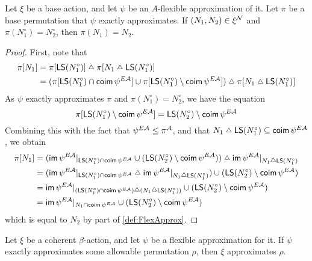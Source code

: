 \begin{proposition}
  \label{prop:FlexApprox.smul_nearLitter_eq}
  \leanok
  Let \( \xi \) be a base action, and let \( \psi \) be an \( A \)-flexible approximation of it.
  Let \( \pi \) be a base permutation that \( \psi \) exactly approximates.
  If \( (N_1, N_2) \in \xi^{\mathcal N} \) and \( \pi(N_1^\circ) = N_2^\circ \), then \( \pi(N_1) = N_2 \).
\end{proposition}
\begin{proof}
  \leanok
  First, note that
  \begin{align*}
    \pi[N_1] &= \pi[\LS(N_1^\circ)] \symmdiff \pi[N_1 \symmdiff \LS(N_1^\circ)] \\
    &= (\pi[\LS(N_1^\circ) \cap \coim \psi^{E\Atom}] \cup \pi[\LS(N_1^\circ) \setminus \coim \psi^{E\Atom}]) \symmdiff \pi[N_1 \symmdiff \LS(N_1^\circ)]
  \end{align*}
  As \( \psi \) exactly approximates \( \pi \) and \( \pi(N_1^\circ) = N_2^\circ \), we have the equation
  \[ \pi[\operatorname{\mathsf{LS}}(N_1^\circ) \setminus \operatorname{\mathsf{coim}} \psi^{E{\mathcal A}}] = \operatorname{\mathsf{LS}}(N_2^\circ) \setminus \operatorname{\mathsf{coim}} \psi^{E{\mathcal A}} \]
  Combining this with the fact that \( \psi^{E{\mathcal A}} \leq \pi^{\mathcal A} \), and that \( N_1 \symmdiff \LS(N_1^\circ) \subseteq \coim \psi^{E\Atom} \), we obtain
  \begin{align*}
    \pi[N_1]
    &= (\im \psi^{E\Atom}|_{\LS(N_1^\circ) \cap \coim \psi^{E\Atom}} \cup (\LS(N_2^\circ) \setminus \coim \psi^{E\Atom})) \symmdiff \im \psi^{E\Atom}|_{N_1 \symmdiff \LS(N_1^\circ)} \\
    &= (\im \psi^{E\Atom}|_{\LS(N_1^\circ) \cap \coim \psi^{E\Atom}} \symmdiff \im \psi^{E\Atom}|_{N_1 \symmdiff \LS(N_1^\circ)})  \cup (\LS(N_2^\circ) \setminus \coim \psi^{E\Atom}) \\
    &= \im \psi^{E\Atom}|_{(\LS(N_1^\circ) \cap \coim \psi^{E\Atom}) \symmdiff (N_1 \symmdiff \LS(N_1^\circ))} \cup (\LS(N_2^\circ) \setminus \coim \psi^{E\Atom}) \\
    &= \im \psi^{E\Atom}|_{N_1 \cap \coim \psi^{E\Atom}} \cup (\LS(N_2^\circ) \setminus \coim \psi^{E\Atom})
  \end{align*}
  which is equal to \( N_2 \) by part of \cref{def:FlexApprox}.
\end{proof}
\begin{proposition}
  \label{prop:approximates_of_flexApprox}
  Let \( \xi \) be a coherent \( \beta \)-action, and let \( \psi \) be a flexible approximation for it.
  If \( \psi \) exactly approximates some allowable permutation \( \rho \), then \( \xi \) approximates \( \rho \).
\end{proposition}
